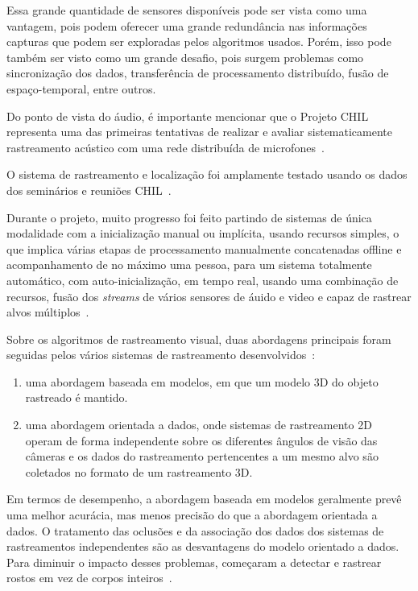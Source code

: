 Essa grande quantidade de sensores disponíveis pode ser vista como uma vantagem, pois podem oferecer uma grande redundância nas informações capturas que podem ser exploradas pelos algoritmos usados. Porém, isso pode também ser visto como um grande desafio, pois surgem problemas como sincronização dos dados, transferência de processamento distribuído, fusão de espaço-temporal, entre outros.

Do ponto de vista do áudio, é importante mencionar que o Projeto CHIL representa uma das primeiras tentativas de realizar e avaliar sistematicamente rastreamento acústico com uma rede distribuída de microfones~\cite{chil}.
	 
O sistema de rastreamento e localização foi amplamente testado usando os dados dos seminários e reuniões CHIL~\cite{chil}.

Durante o projeto, muito progresso foi feito partindo de sistemas de única modalidade com a inicialização manual ou implícita, usando recursos simples, o que implica várias etapas de processamento manualmente concatenadas offline e acompanhamento de no máximo uma pessoa, para um sistema totalmente automático, com auto-inicialização, em tempo real, usando uma combinação de recursos, fusão dos \textit{streams} de vários sensores de áuido e video e capaz de rastrear alvos múltiplos~\cite{chil}.

Sobre os algoritmos de rastreamento visual, duas abordagens principais foram seguidas pelos vários sistemas de rastreamento desenvolvidos~\cite{chil}:
	
	\begin{enumerate}
		\item uma abordagem baseada em modelos, em que um modelo 3D do objeto rastreado é mantido.
		\item  uma abordagem orientada a dados, onde sistemas de rastreamento 2D operam de forma independente sobre os diferentes ângulos de visão das câmeras e os dados do rastreamento pertencentes a um mesmo alvo são coletados no formato de um rastreamento 3D.
	\end{enumerate}

 Em termos de desempenho, a abordagem baseada em modelos geralmente prevê uma melhor acurácia, mas menos precisão do que a abordagem orientada a dados. O tratamento das oclusões e da associação dos dados dos sistemas de rastreamentos independentes são as desvantagens do modelo orientado a dados. Para diminuir o impacto desses problemas, começaram a detectar e rastrear rostos em vez de corpos inteiros~\cite{chil}.

